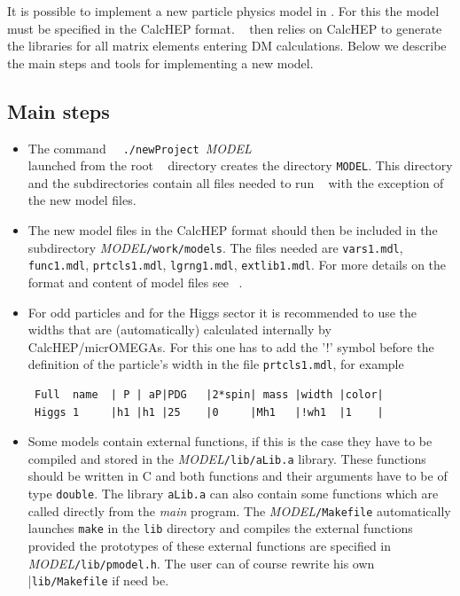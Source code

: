 \documentclass[12pt,a4paper]{article}
\begin{document}
{It is possible to  implement a new particle physics  model  in \micro.
For this the model must be specified in the
CalcHEP format. \micro~ then relies on CalcHEP 
to generate the libraries for all matrix elements entering DM calculations. 
Below we describe the main steps and tools for implementing a new model.

\subsection{Main steps}
\begin{itemize}
\item
The command
\verb|  ./newProject |{\it MODEL}\\
launched from the root \micro~ directory  creates the directory 
\verb|MODEL|. This directory and the subdirectories contain all files needed to run \micro~ with the
exception of the new model files. 

\item
The new model files in the CalcHEP format should then be included in the
 subdirectory {\it MODEL}\verb|/work/models|.  The files needed are
\verb|vars1.mdl|,  \verb|func1.mdl|,  \verb|prtcls1.mdl|, \verb|lgrng1.mdl|,
\verb|extlib1.mdl|. For more details on the format and content of model files see
~\cite{Pukhov:2004ca}.

\item
For odd particles and for the Higgs sector it is recommended to use the widths that are (automatically) calculated internally by 
CalcHEP/micrOMEGAs. 
For this  one has to add the '!' symbol before  
the definition of the particle's width  in  the file \verb|prtcls1.mdl|, for example
\begin{verbatim}
 Full  name  | P | aP|PDG   |2*spin| mass |width |color|  
 Higgs 1     |h1 |h1 |25    |0     |Mh1   |!wh1  |1    |
\end{verbatim}


\item
Some models contain  external functions, if this is the case  they have to be 
compiled and stored in the {\it MODEL}\verb|/lib/aLib.a| library. 
These functions should be written in C and both functions and their arguments have to be 
of type \verb|double|. The library \verb|aLib.a| 
can also contain some functions which are called directly from the 
{\it main} program. The {\it MODEL}\verb|/Makefile| automatically launches
\verb|make| in the \verb|lib| directory and compiles the external functions provided
the prototypes of these external 
functions are specified in  {\it MODEL}\verb|/lib/pmodel.h|. 
The user can of course rewrite 
his own  |\verb|lib/Makefile| if need be.


\end{itemize}}
\end{document}
